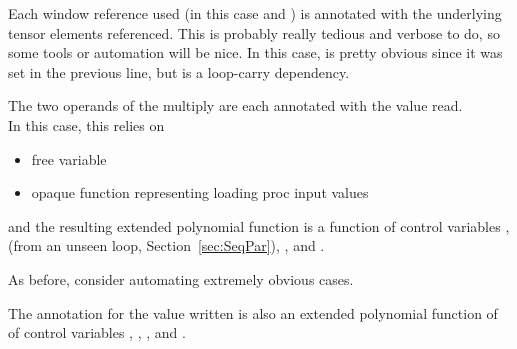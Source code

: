 \begin{samepage}  %



\end{samepage}
\begin{samepage}

Each window reference used (in this case  and ) is annotated with the underlying tensor elements referenced.
This is probably really tedious and verbose to do, so some tools or automation will be nice.
In this case,  is pretty obvious since it was set in the previous line, but  is a loop-carry dependency.



\end{samepage}
\begin{samepage}

The two operands of the multiply are each annotated with the value read.\\
In this case, this relies on
\begin{itemize}
  \item free variable 
  \item opaque function  representing loading proc input values
\end{itemize}
and the resulting extended polynomial function is a function of control variables ,  (from an unseen  loop, Section~\ref{sec:SeqPar}), , and .

As before, consider automating extremely obvious cases.



\end{samepage}
\begin{samepage}

The annotation for the value written is also an extended polynomial function of of control variables , , , and .



\end{samepage}

